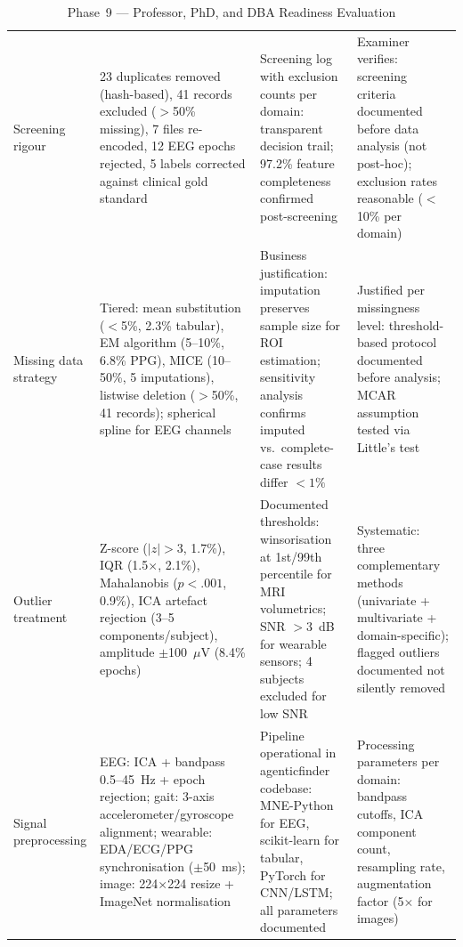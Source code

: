 \begingroup\singlespacing\tablefontsize\tablestripes
\begin{xltabular}{\textwidth}{@{} l X X X @{}}
\caption{Phase~9 --- Professor, PhD, and DBA Readiness Evaluation}
\label{tab:phase9_readiness}\\
\toprule
{} &  &  &  \\
\midrule
\endfirsthead
\endhead
\bottomrule
\endlastfoot
Screening rigour       & 23 duplicates removed (hash-based), 41 records excluded ($>$50\% missing), 7 files re-encoded, 12 EEG epochs rejected, 5 labels corrected against clinical gold standard & Screening log with exclusion counts per domain: transparent decision trail; 97.2\% feature completeness confirmed post-screening & Examiner verifies: screening criteria documented before data analysis (not post-hoc); exclusion rates reasonable ($<$10\% per domain) \\
\addlinespace
Missing data strategy  & Tiered: mean substitution ($<$5\%, 2.3\% tabular), EM algorithm (5--10\%, 6.8\% PPG), MICE (10--50\%, 5 imputations), listwise deletion ($>$50\%, 41 records); spherical spline for EEG channels & Business justification: imputation preserves sample size for ROI estimation; sensitivity analysis confirms imputed vs.\ complete-case results differ $< 1\%$ & Justified per missingness level: threshold-based protocol documented before analysis; MCAR assumption tested via Little's test \\
\addlinespace
Outlier treatment      & Z-score ($|z| > 3$, 1.7\%), IQR (1.5$\times$, 2.1\%), Mahalanobis ($p < .001$, 0.9\%), ICA artefact rejection (3--5 components/subject), amplitude $\pm$100~$\mu$V (8.4\% epochs) & Documented thresholds: winsorisation at 1st/99th percentile for MRI volumetrics; SNR $> 3$~dB for wearable sensors; 4 subjects excluded for low SNR & Systematic: three complementary methods (univariate + multivariate + domain-specific); flagged outliers documented not silently removed \\
\addlinespace
Signal preprocessing   & EEG: ICA + bandpass 0.5--45~Hz + epoch rejection; gait: 3-axis accelerometer/gyroscope alignment; wearable: EDA/ECG/PPG synchronisation ($\pm$50~ms); image: 224$\times$224 resize + ImageNet normalisation & Pipeline operational in agenticfinder codebase: MNE-Python for EEG, scikit-learn for tabular, PyTorch for CNN/LSTM; all parameters documented & Processing parameters per domain: bandpass cutoffs, ICA component count, resampling rate, augmentation factor (5$\times$ for images) \\

\end{xltabular}

